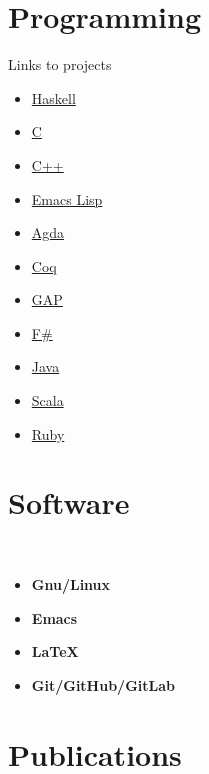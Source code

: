 \documentclass[nocolors]{friggeri-cv-a4}
\begin{document}
\begin{aside}
\section{Programming}
{\small Links to projects \begin{itemize}
  \item \href{https://github.com/mroman42/mikrokosmos}{Haskell}
  \item \href{https://github.com/mroman42/granasatClient}{C}
  \item \href{https://github.com/mroman42/programming}{C++}
    \item \href{https://github.com/mroman42/cosmoi-emacs}{Emacs Lisp}
    \item \href{https://github.com/mroman42/ctlc}{Agda}
    \item \href{https://github.com/UniMath/UniMath/commit/e26dacaec4bd1e0b26616fcecc9bba5e507cb941}{Coq}
    \item \href{https://github.com/homalg-project/FinSetsForCAP/pull/24}{GAP}
    \item \href{https://github.com/mroman42/funzionale}{F#}
    \item \href{https://github.com/mroman42/Napakalaki}{Java}
    \item \href{https://github.com/mroman42/linguaggi/blob/master/scala/brainfuck.scala}{Scala}
    \item \href{https://github.com/mroman42/rbNapakalaki}{Ruby}
    \end{itemize}
}

\section{Software}\\
{\small \begin{itemize}
  \item \textbf{Gnu/Linux}
  \item \textbf{Emacs}
  \item \textbf{LaTeX}
  \item \textbf{Git/GitHub/GitLab}
  \end{itemize}
}
\end{aside}


 \section{Publications}
\end{document}
